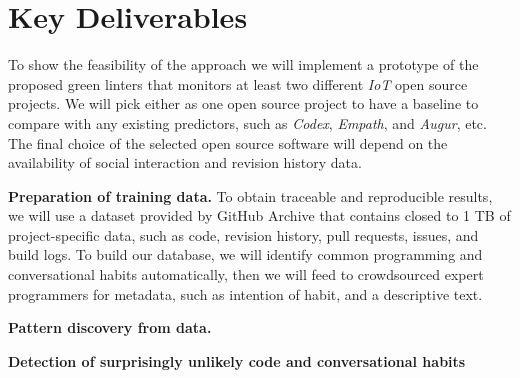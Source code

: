 \section{Key Deliverables}
\label{sec:deliverables}

To show the feasibility of the approach we will implement a prototype of the proposed green linters that monitors at least two different \textit{IoT} open source projects. We will pick either  as one open source project to have a baseline to compare with any existing predictors, such as \textit{Codex}, \textit{Empath}, and \textit{Augur}, etc. The final choice of the selected open source software will depend on the availability of social interaction and revision history data.

{\bfseries Preparation of training data.} To obtain traceable and reproducible results, we will use a dataset provided by GitHub Archive that contains closed to 1 TB of project-specific data, such as code, revision history, pull requests, issues, and build logs. To build our database, we will identify common programming and conversational habits automatically, then we will feed to crowdsourced expert programmers for metadata, such as intention of habit, and a descriptive text.

{\bfseries Pattern discovery from data.} 

{\bfseries Detection of surprisingly unlikely code and conversational habits} 


